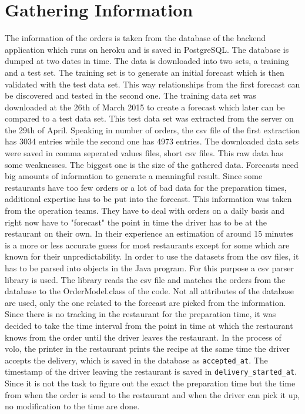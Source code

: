 \section{Gathering Information}\label{section:Gathering Information}
The information of the orders is taken from the database of the backend application which runs on heroku and is saved in PostgreSQL. The database is dumped at two dates in time. The data is downloaded into two sets, a training and a test set. The training set is to generate an initial forecast which is then validated with the test data set. This way relationships from the first forecast can be discovered and tested in the second one. The training data set was downloaded at the 26th of March 2015 to create a forecast which later can be compared to a test data set. This test data set was extracted from the server on the 29th of April. Speaking in number of orders, the csv file of the first extraction has 3034 entries while the second one has 4973 entries. The downloaded data sets were saved in comma seperated values files, short csv files.\newline
This raw data has some weaknesses. The biggest one is the size of the gathered data. Forecasts need big amounts of information to generate a meaningful result. Since some restaurants have too few orders or a lot of bad data for the preparation times, additional expertise has to be put into the forecast. This information was taken from the operation teams. They have to deal with orders on a daily basis and right now have to "forecast" the point in time the driver has to be at the restaurant on their own. In their experience an estimation of around 15 minutes is a more or less accurate guess for most restaurants except for some which are known for their unpredictability.\newline
In order to use the datasets from the csv files, it has to be parsed into objects in the Java program. For this purpose a csv parser library is used. The library reads the csv file and matches the orders from the database to the OrderModel.class of the code. Not all attributes of the database are used, only the one related to the forecast are picked from the information. Since there is no tracking in the restaurant for the preparation time, it was decided to take the time interval from the point in time at which the restaurant knows from the order until the driver leaves the restaurant. In the process of volo, the printer in the restaurant prints the recipe at the same time the driver accepts the delivery, which is saved in the database as \texttt{accepted\_at}. The timestamp of the driver leaving the restaurant is saved in \texttt{delivery\_started\_at}. Since it is not the task to figure out the exact the preparation time but the time from when the order is send to the restaurant and when the driver can pick it up, no modification to the time are done.
